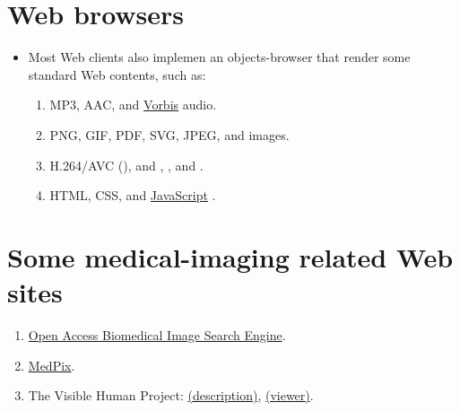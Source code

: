 \section{Web browsers}
\begin{itemize}
\item Most Web clients also implemen an objects-browser that  render
  some standard Web contents, such as:
  \begin{enumerate}
  \item \gls{MP3}, \gls{AAC}, and \href{https://en.wikipedia.org/wiki/Vorbis}{Vorbis} audio.
  \item \gls{PNG}, \gls{GIF}, \gls{PDF}, \gls{SVG}, \gls{JPEG}, and
     images.
  \item H.264/\gls{AVC} (), and , ,
     and
    .
  \item \gls{HTML}, \gls{CSS}, and
    \href{https://en.wikipedia.org/wiki/JavaScript}{JavaScript}
    .
  \end{enumerate}
\end{itemize}

\section{Some medical-imaging related Web sites}
\begin{enumerate}
\item \href{https://openi.nlm.nih.gov/}{Open Access Biomedical Image Search Engine}.
\item \href{https://medpix.nlm.nih.gov/home}{MedPix}.
\item The Visible Human Project:
  \href{https://www.nlm.nih.gov/research/visible/visible_human.html}{(description)},
  \href{https://visiblehumanproject.com/}{(viewer)}.
\end{enumerate}
